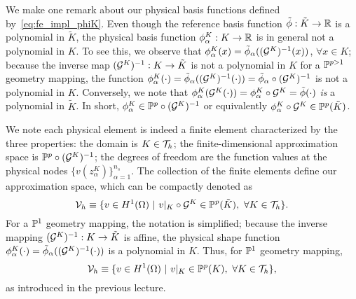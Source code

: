 We make one remark about our physical basis functions defined by~\eqref{eq:fe_impl_phiK}.  Even though the reference basis function $\tilde \phi: \tilde K \to \mathbb{R}$ is a polynomial in $\tilde K$, the physical basis function $\phi^K_\alpha: K \to \mathbb{R}$ is in general not a polynomial in $K$. To see this, we observe that $\phi^K_\alpha(x) = \tilde \phi_\alpha((\mathcal{G}^K)^{-1}(x))$, $\forall x \in K$; because the inverse map $(\mathcal{G}^K)^{-1}: K \to \tilde K$ is not a polynomial in $K$ for a $\mathbb{P}^{p>1}$ geometry mapping, the function $\phi^K_\alpha(\cdot) = \tilde \phi_\alpha((\mathcal{G}^K)^{-1}(\cdot)) = \tilde \phi_\alpha \circ (\mathcal{G}^K)^{-1}$ is not a polynomial in $K$.  Conversely, we note that $\phi^K_\alpha(\mathcal{G}^K(\cdot)) = \phi^K_\alpha \circ \mathcal{G}^K = \tilde \phi(\cdot)$ \emph{is} a polynomial in $\tilde K$. In short, $\phi_\alpha^K \in \mathbb{P}^{p} \circ (\mathcal{G}^K)^{-1}$ or equivalently $\phi_\alpha^K \circ \mathcal{G}^K \in \mathbb{P}^p(\tilde K)$.

We note each physical element is indeed a finite element characterized by the three properties: the domain is $K \in \mathcal{T}_h$; the finite-dimensional approximation space is $\mathbb{P}^p \circ (\mathcal{G}^K)^{-1}$; the degrees of freedom are the function values at the physical nodes $\{ v(z^K_\alpha) \}_{\alpha=1}^{n_s}$.  The collection of the finite elements define our approximation space, which can be compactly denoted as
\begin{equation*}
  \mathcal{V}_h \equiv \{ v \in H^1(\Omega) \ | \ v|_K \circ \mathcal{G}^K \in \mathbb{P}^p(\tilde K), \ \forall K \in \mathcal{T}_h \}.
\end{equation*}
For a $\mathbb{P}^1$ geometry mapping, the notation is simplified; because the inverse mapping $(\mathcal{G}^K)^{-1}: K \to \tilde K$ is affine, the physical shape function $\phi^K_\alpha(\cdot) = \tilde \phi_\alpha((\mathcal{G}^K)^{-1}(\cdot))$ is a polynomial in $K$. Thus, for $\mathbb{P}^1$ geometry mapping,
\begin{equation*}
  \calV_h \equiv \{ v \in H^1(\Omega) \ | \ v|_K \in \PP^p(K), \ \forall K \in \calT_h \},
\end{equation*}
as introduced in the previous lecture.



